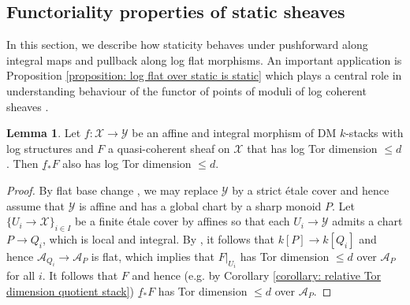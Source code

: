 \documentclass[11pt]{amsart}
\theoremstyle{definition}
\theoremstyle{definition}
\newtheorem{lemma}[theorem]{Lemma}
\newcommand{\ul}[1]{\underline{#1}}
\begin{document}
\subsection{Functoriality properties of static sheaves} In this section, we describe how staticity behaves under pushforward along integral maps and pullback along log flat morphisms. An important application is Proposition \ref{proposition: log flat over static is static} which plays a central role in understanding behaviour of the functor of points of moduli of log coherent sheaves \cite{Kennedy-Hunt-Poiret-Song:Log-Vector-bundle}.
\begin{lemma}\label{lemma-on-pushforward-along-integral-affine-preserves-log-Tor dimensions}
Let $f\colon \mathcal{X}\rightarrow \mathcal{Y}$ be an affine and integral morphism of DM $k$-stacks with log structures and $F$ a quasi-coherent sheaf on $\mathcal{X}$ that has log Tor dimension $\leq d$. Then $\ul{f}{}_{*}F$ also has log Tor dimension $\leq d$.
\end{lemma}
\begin{proof}
By flat base change \cite[Lemma 1.2(4)]{HallRydh2017}, we may replace $\mathcal{Y}$ by a strict \'etale cover and hence assume that $\mathcal{Y}$ is affine and has a global chart by a sharp monoid $P$. Let $\{U_i\rightarrow \mathcal{X}\}_{i\in I}$ be a finite \'etale cover by affines so that each $U_i\rightarrow \mathcal{Y}$ admits a chart $P\rightarrow Q_i$, which is local and integral. By \cite[Proposition I.4.6.7]{lecturesonlogarithmicalgebraicgeometry}, it follows that $k[P]\rightarrow k[Q_i]$ and hence $\mathcal{A}_{Q_i}\rightarrow \mathcal{A}_{P}$ is flat, which implies that $F|_{U_i}$ has Tor dimension $\leq d$ over $\mathcal{A}_{P}$ for all $i$. It follows that $F$ and hence (e.g. by Corollary \ref{corollary: relative Tor dimension quotient stack}) $\ul{f}{}_{*}F$ has Tor dimension $\leq d$ over $\mathcal{A}_P$.  
\end{proof}
\end{document}
